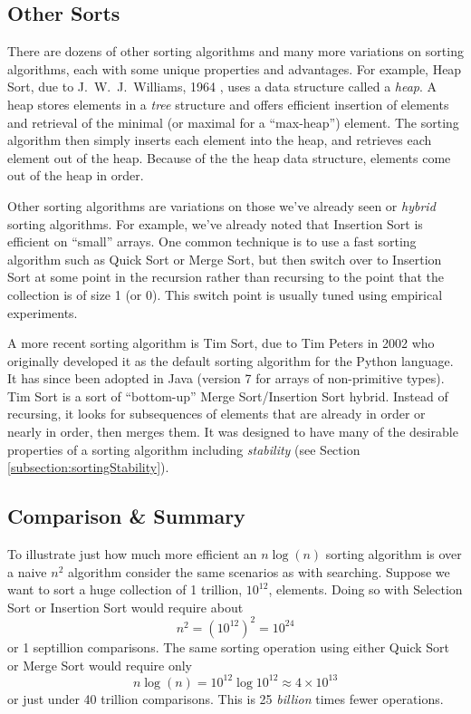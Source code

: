 \subsection{Other Sorts}
\label{subsection:otherSorts}

There are dozens of other sorting algorithms and many more variations on
sorting algorithms, each with some unique properties and advantages.  
For example, Heap Sort, due to J.\ W.\ J.\ Williams, 1964 
\cite{williams1964algorithm}, uses a data structure called a \emph{heap}.
  A heap stores elements in
a \emph{tree} structure and offers efficient insertion of elements and
retrieval of the minimal (or maximal for a ``max-heap'') element.  The
sorting algorithm then simply inserts each element into the heap, and
retrieves each element out of the heap.  Because of the the heap data
structure, elements come out of the heap in order.  

Other sorting algorithms are variations on those we've already seen or
\emph{hybrid} sorting algorithms.  For example, we've already noted that
Insertion Sort is efficient on ``small'' arrays.  One common technique
is to use a fast sorting algorithm such as Quick Sort or Merge Sort, but
then switch over to Insertion Sort at some point in the recursion rather
than recursing to the point that the collection is of size 1 (or 0).  
This switch point is usually tuned using empirical experiments.  

A more recent sorting algorithm is Tim Sort, due to Tim Peters in 2002 
\cite{Peters2002}  who originally 
developed it as the default sorting algorithm for the Python language.  
It has since been adopted in Java (version 7 for arrays of non-primitive 
types).  Tim Sort is a sort of ``bottom-up'' Merge Sort/Insertion Sort
hybrid.  Instead of recursing, it looks for subsequences of elements that
are already in order or nearly in order, then merges them.  It was designed
to have many of the desirable properties of a sorting algorithm 
including \emph{stability} (see Section \ref{subsection:sortingStability}).


\subsection{Comparison \& Summary}

To illustrate just how much more efficient an $n\log{(n)}$ sorting algorithm
is over a naive $n^2$ algorithm consider the same scenarios as with searching.
Suppose we want to sort a huge collection of 1 trillion, $10^{12}$, elements.
Doing so with Selection Sort or Insertion Sort would require about 
  $$n^2 = (10^{12})^2 = 10^{24}$$
or 1 septillion comparisons.  The same sorting operation using either
Quick Sort or Merge Sort would require only
  $$n\log{(n)} = 10^{12} \log{10^{12}} \approx 4 \times 10^{13}$$
or just under 40 trillion comparisons.  This is 25 \emph{billion} times
fewer operations.  

